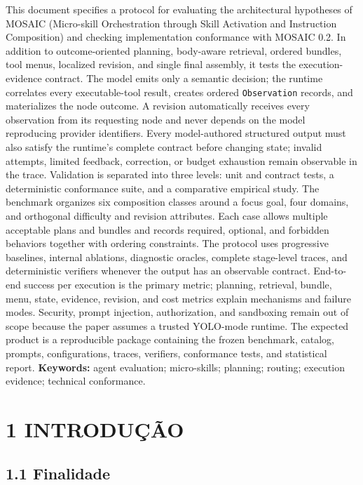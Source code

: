 \documentclass[12pt,a4paper]{article}
\begin{document}
This document specifies a protocol for evaluating the architectural hypotheses of MOSAIC (Micro-skill Orchestration through Skill Activation and Instruction Composition) and checking implementation conformance with MOSAIC 0.2. In addition to outcome-oriented planning, body-aware retrieval, ordered bundles, tool menus, localized revision, and single final assembly, it tests the execution-evidence contract. The model emits only a semantic decision; the runtime correlates every executable-tool result, creates ordered \texttt{Observation} records, and materializes the node outcome. A revision automatically receives every observation from its requesting node and never depends on the model reproducing provider identifiers. Every model-authored structured output must also satisfy the runtime's complete contract before changing state; invalid attempts, limited feedback, correction, or budget exhaustion remain observable in the trace. Validation is separated into three levels: unit and contract tests, a deterministic conformance suite, and a comparative empirical study. The benchmark organizes six composition classes around a focus goal, four domains, and orthogonal difficulty and revision attributes. Each case allows multiple acceptable plans and bundles and records required, optional, and forbidden behaviors together with ordering constraints. The protocol uses progressive baselines, internal ablations, diagnostic oracles, complete stage-level traces, and deterministic verifiers whenever the output has an observable contract. End-to-end success per execution is the primary metric; planning, retrieval, bundle, menu, state, evidence, revision, and cost metrics explain mechanisms and failure modes. Security, prompt injection, authorization, and sandboxing remain out of scope because the paper assumes a trusted YOLO-mode runtime. The expected product is a reproducible package containing the frozen benchmark, catalog, prompts, configurations, traces, verifiers, conformance tests, and statistical report. \textbf{Keywords:} agent evaluation; micro-skills; planning; routing; execution evidence; technical conformance.


\section*{1 INTRODUÇÃO}

\subsection*{1.1 Finalidade}
\end{document}
